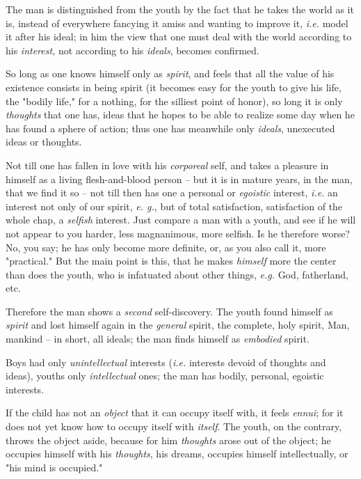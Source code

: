 \documentclass[a4paper]{book}
\begin{document}
The man is distinguished from the youth by the fact that he takes the world as 
it is, instead of everywhere fancying it amiss and wanting to improve it, 
\textit{i.e.} model it after his ideal; in him the view that one must deal 
with the world according to his \textit{interest,} not according to his 
\textit{ideals}, becomes confirmed.

So long as one knows himself only as \textit{spirit}, and feels that all the 
value of his existence consists in being spirit (it becomes easy for the youth 
to give his life, the "{}bodily life,"{} for a nothing, for the silliest point 
of honor), so long it is only \textit{thoughts} that one has, ideas that he 
hopes to be able to realize some day when he has found a sphere of action; 
thus one has meanwhile only \textit{ideals}, unexecuted ideas or thoughts.

Not till one has fallen in love with his \textit{corporeal} self, and takes a 
pleasure in himself as a living flesh-and-blood person -- but it is in mature 
years, in the man, that we find it so -- not till then has one a personal or 
\textit{egoistic} interest, \textit{i.e.} an interest not only of our spirit, 
\textit{e. g.}, but of total satisfaction, satisfaction of the whole chap, a 
\textit{selfish} interest. Just compare a man with a youth, and see if he will 
not appear to you harder, less magnanimous, more selfish. Is he therefore 
worse? No, you say; he has only become more definite, or, as you also call it, 
more "{}practical."{} But the main point is this, that he makes 
\textit{himself} more the center than does the youth, who is infatuated about 
other things, \textit{e.g.} God, fatherland, etc.

Therefore the man shows a \textit{second} self-discovery. The youth found 
himself as \textit{spirit} and lost himself again in the \textit{general} 
spirit, the complete, holy spirit, Man, mankind -- in short, all ideals; the 
man finds himself as \textit{embodied} spirit.

Boys had only \textit{unintellectual} interests (\textit{i.e.} interests 
devoid of thoughts and ideas), youths only \textit{intellectual} ones; the man 
has bodily, personal, egoistic interests.

If the child has not an \textit{object} that it can occupy itself with, it 
feels \textit{ennui}; for it does not yet know how to occupy itself with 
\textit{itself}. The youth, on the contrary, throws the object aside, because 
for him \textit{thoughts} arose out of the object; he occupies himself with 
his \textit{thoughts}, his dreams, occupies himself intellectually, or "{}his 
mind is occupied."{}
\end{document}
